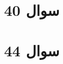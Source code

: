 \documentclass[12pt]{article}
\begin{document}
\section*{سوال 40}

\section*{سوال 44}

 
\end{document}
